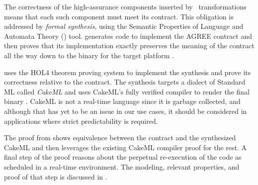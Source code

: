 The correctness of the high-assurance components inserted
by \briefcase \ transformations means that each such component
must meet its \agree{} contract. This obligation is addressed by
\emph{formal synthesis}, using the Semantic Properties of Language
and Automata Theory (\splat) tool.  
\splat{} generates code to implement the AGREE contract and then proves that its implementation exactly preserves the meaning of the contract all the way down to the binary for the target platform \cite{case-models-2021}.

\splat{} uses the HOL4 theorem proving system to implement the synthesis and prove its correctness relative to the contract.
The synthesis targets a dialect of Standard ML called \emph{CakeML} and uses CakeML's fully verified compiler to render the final binary \cite{cakeml}.
CakeML is not a real-time language since it is garbage collected, and although that has yet to be an issue in our use cases, it should be considered in applications where strict predictability is required.

The proof from \splat{} shows equivalence between the contract and the synthesized CakeML and then leverages the existing CakeML compiler proof for the rest.
A final step of the proof reasons about the perpetual re-execution of the code as scheduled in a real-time environment.
The modeling, relevant properties, and proof of that step is discussed in \cite{johannes:repeat}.


